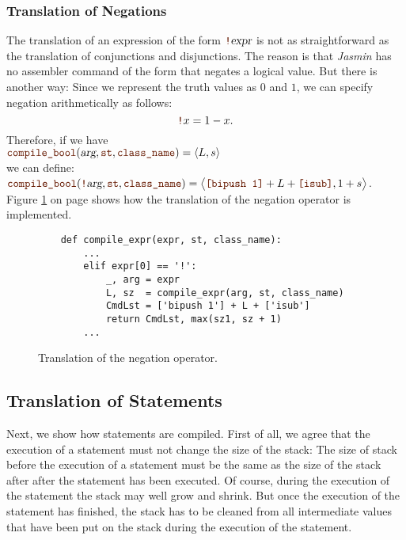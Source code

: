 \subsubsection{Translation of Negations}
The translation of an expression of the form $\mytt{!}\textsl{expr}$ is not as straightforward as the
translation of conjunctions and disjunctions.  The reason is that \textsl{Jasmin} has no assembler command of
the form  that negates a logical value.  But there is another way: Since we represent the truth
values as $0$ and $1$, we can specify negation arithmetically as follows:
\[ \mytt{!}x = 1 - x. \]
Therefore, if we have
\\[0.2cm]
\hspace*{1.3cm}
$\mytt{compile\_bool}(\textsl{arg}, \mytt{st}, \mytt{class\_name}) = \pair(L, s)$
\\[0.2cm]
we can define:
\\[0.2cm]
\hspace*{1.3cm}
$\mytt{compile\_bool}(\mytt{!}\textsl{arg}, \mytt{st}, \mytt{class\_name})
= \bigl\langle \mytt{[bipush 1]} + L + \mytt{[isub]}, 1 + s \bigr\rangle$.
\\[0.2cm]
Figure \ref{fig:Compiler.ipynb:compile:not} on page \pageref{fig:Compiler.ipynb:compile:not} shows how the
translation of the negation operator is implemented.

\begin{figure}[!ht]
\centering
\begin{verbatim}
    def compile_expr(expr, st, class_name):
        ...
        elif expr[0] == '!':
            _, arg = expr
            L, sz  = compile_expr(arg, st, class_name)
            CmdLst = ['bipush 1'] + L + ['isub']
            return CmdLst, max(sz1, sz + 1)
        ...
\end{verbatim}
\vspace*{-0.3cm}
\caption{Translation of the negation operator.}
\label{fig:Compiler.ipynb:compile:not}
\end{figure}


\subsection{Translation of Statements}
Next, we show how statements are compiled.  First of all, we agree that the execution of a statement
must not change the size of the stack:  The size of stack before the execution of a statement must
be the same as the size of the stack after after the statement has been executed.
Of course, during the execution of the statement the stack may well
grow and shrink.  But once the execution of the statement has finished, the stack has to be cleaned from all
intermediate values that have been put on the stack during the execution of the statement.

